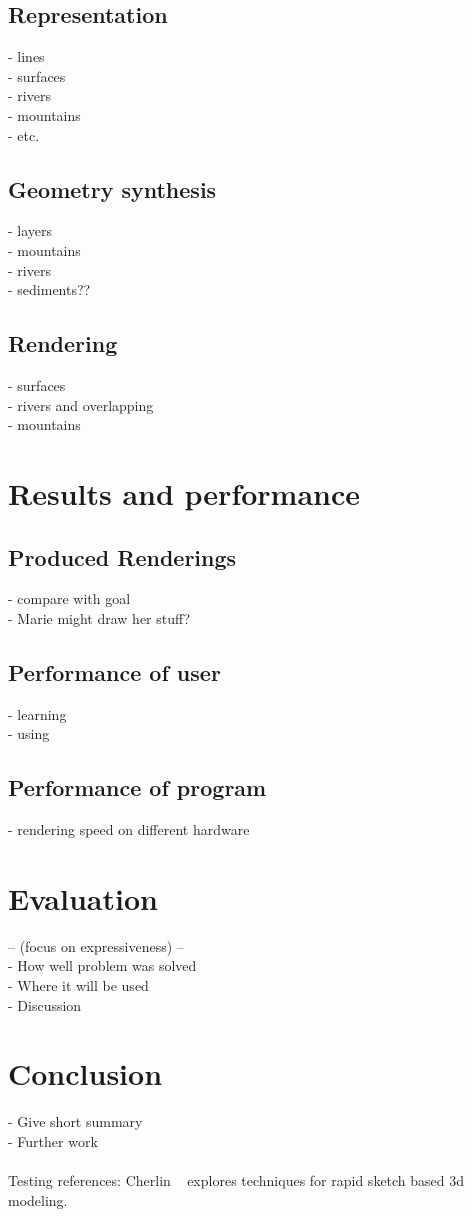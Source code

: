 \documentclass[a4paper,10pt]{article}
\begin{document}
\subsection{Representation}
- lines\\
- surfaces\\
- rivers\\
- mountains\\
- etc.
\subsection{Geometry synthesis}
- layers\\
- mountains\\
- rivers\\
- sediments??
\subsection{Rendering}
- surfaces\\
- rivers and overlapping\\
- mountains

\section{Results and performance}
\subsection{Produced Renderings}
- compare with goal\\
- Marie might draw her stuff?
\subsection{Performance of user}
- learning\\
- using
\subsection{Performance of program}
- rendering speed on different hardware

\section{Evaluation}
 -- (focus on expressiveness) -- \\
- How well problem was solved\\
- Where it will be used \\
- Discussion

\section{Conclusion}
- Give short summary\\
- Further work\\
\\


Testing references: Cherlin ~\cite{Cherlin:2005:SMF:1090122.1090145} explores techniques for rapid sketch based 3d modeling.


{}

\end{document}
